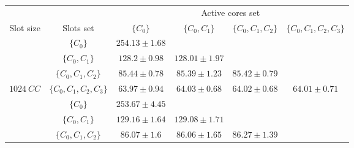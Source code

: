 \begin{tabular}{|c|c||c|c|c|c|}
        \hline
                                    &                                       & \multicolumn{4}{c|}{Active cores set}                                                                                                                         \\
        \cline{3-6}
        \multirow{-2}{*}{Slot size} & \multirow{-2}{*}{Slots set} & \multicolumn{1}{p{2.75cm}|}{$\{C_{0}\}$} & \multicolumn{1}{p{2.75cm}|}{$\{C_{0}, C_{1}\}$} & \multicolumn{1}{p{2.75cm}|}{$\{C_{0}, C_{1}, C_{2}\}$} & \multicolumn{1}{p{2.75cm}|}{$\{C_{0}, C_{1}, C_{2}, C_{3}\}$} \\
        \hline
        \hline
                                    & $\{C_{0}\}$                           & $254.13 \pm 1.68$    & \cellcolor[HTML]{C0C0C0}        & \cellcolor[HTML]{C0C0C0}                & \cellcolor[HTML]{C0C0C0}                       \\
        \cline{2-6}
                                    & $\{C_{0}, C_{1}\}$                    & $128.2 \pm 0.98$    & $128.01 \pm 1.97$    & \cellcolor[HTML]{C0C0C0}                & \cellcolor[HTML]{C0C0C0}                       \\
        \cline{2-6}
                                    & $\{C_{0}, C_{1}, C_{2}\}$             & $85.44 \pm 0.78$    & $85.39 \pm 1.23$    & $85.42 \pm 0.79$            & \cellcolor[HTML]{C0C0C0}                       \\
        \cline{2-6}
        \multirow{-4}{*}{$1024~CC$} & $\{C_{0}, C_{1}, C_{2}, C_{3}\}$      & $63.97 \pm 0.94$    & $64.03 \pm 0.68$    & $64.02 \pm 0.68$            &  $64.01 \pm 0.71$                  \\
        \hline
        \hline
                                    & $\{C_{0}\}$                           & $253.67 \pm 4.45$    & \cellcolor[HTML]{C0C0C0}        & \cellcolor[HTML]{C0C0C0}                & \cellcolor[HTML]{C0C0C0}                       \\
        \cline{2-6}
                                    & $\{C_{0}, C_{1}\}$                    & $129.16 \pm 1.64$    & $129.08 \pm 1.71$    & \cellcolor[HTML]{C0C0C0}                & \cellcolor[HTML]{C0C0C0}                       \\
        \cline{2-6}
                                    & $\{C_{0}, C_{1}, C_{2}\}$             & $86.07 \pm 1.6$    & $86.06 \pm 1.65$    & $86.27 \pm 1.39$            & \cellcolor[HTML]{C0C0C0}                       \\

\end{tabular}
